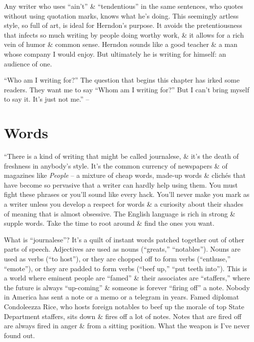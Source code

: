 \documentclass{article}
\begin{document}
Any writer who uses ``ain't'' \& ``tendentious'' in the same sentences, who quotes without using quotation marks, knows what he's doing. This seemingly artless style, so full of art, is ideal for Herndon's purpose. It avoids the pretentiousness that infects so much writing by people doing worthy work, \& it allows for a rich vein of humor \& common sense. Herndon sounds like a good teacher \& a man whose company I would enjoy. But ultimately he is writing for himself: an audience of one.

``Who am I writing for?'' The question that begins this chapter has irked some readers. They want me to say ``Whom am I writing for?'' But I can't bring myself to say it. It's just not me.'' -- \cite[pp. 30--35]{Zinsser2016}


\section{Words}
``There is a kind of writing that might be called journalese, \& it's the death of freshness in anybody's style. It's the common currency of newspapers \& of magazines like \textit{People} -- a mixture of cheap words, made-up words \& clich\'es that have become so pervasive that a writer can hardly help using them. You must fight these phrases or you'll sound like every hack. You'll never make you mark as a writer unless you develop a respect for words \& a curiosity about their shades of meaning that is almost obsessive. The English language is rich in strong \& supple words. Take the time to root around \& find the ones you want.

What is ``journalese''? It's a quilt of instant words patched together out of other parts of speech. Adjectives are used as nouns (``greats,'' ``notables''). Nouns are used as verbs (``to host''), or they are chopped off to form verbs (``enthuse,'' ``emote''), or they are padded to form verbs (``beef up,'' ``put teeth into''). This is a world where eminent people are ``famed'' \& their associates are ``staffers,'' where the future is always ``up-coming'' \& someone is forever ``firing off'' a note. Nobody in America has sent a note or a memo or a telegram in years. Famed diplomat Condoleezza Rice, who hosts foreign notables to beef up the morale of top State Department staffers, sits down \& fires off a lot of notes. Notes that are fired off are always fired in anger \& from a sitting position. What the weapon is I've never found out.
\end{document}
